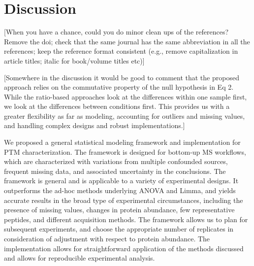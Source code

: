 \documentclass[mcp]{article}
\numberwithin{table}{section}
\def\todo#1{{\color{red}[#1]}}
\begin{document}

\section{Discussion}

\todo{When you have a chance, could you do minor clean ups of the references? Remove the doi; check that the same journal has the same abbreviation in all the references; keep the reference format consistent (e.g., remove capitalization in article titles; italic for book/volume titles etc)} 

\todo{Somewhere in the discussion it would be good to comment that the proposed approach relies on the commutative property of the null hypothesis in Eq 2. While the ratio-based approaches look at the differences within one sample first, we look at the differences between conditions first. This provides us with a greater flexibility as far as modeling, accounting for outliers and missing values, and handling complex designs and robust implementations.}

We proposed a general statistical modeling framework and implementation for PTM characterization. The framework is designed for bottom-up MS workflows, which are characterized with variations from multiple confounded sources, frequent missing data, and associated uncertainty in the conclusions. The framework is general and is applicable to a variety of experimental designs. It outperforms the ad-hoc methods underlying ANOVA and Limma, and yields accurate results in the broad type of experimental circumstances, including the presence of missing values, changes in protein abundance, few representative peptides, and different acquisition methods. The framework allows us to plan for subsequent experiments, and choose the appropriate number of replicates in consideration of adjustment with respect to protein abundance. The implementation allows for straightforward application of the methods discussed and allows for reproducible experimental analysis.
\end{document}
